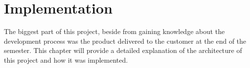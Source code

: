 \chapter{Implementation}

The biggest part of this project, beside from gaining knowledge about the development process was the product delivered to the customer at the end of the semester.
This chapter will provide a detailed explanation of the architecture of this project and how it was implemented.
\newpage
